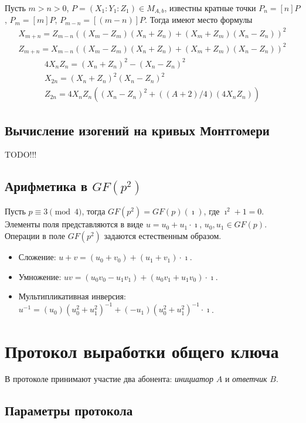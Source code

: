 \documentclass[a4paper,12pt]{article}
\theoremstyle{definition}
\begin{document}
Пусть $m>n>0$, $P=(X_1:Y_1:Z_1)\in M_{A,b}$, известны кратные точки $P_{n}=[n]P$, $P_{m}=[m]P$, $P_{m-n}=[(m-n)]P$. Тогда имеют место формулы
\begin{eqnarray*}
X_{m+n}=Z_{m-n}((X_m-Z_m)(X_n+Z_n)+(X_m+Z_m)(X_n-Z_n))^2\\
Z_{m+n}=X_{m-n}((X_m-Z_m)(X_n+Z_n)+(X_m+Z_m)(X_n-Z_n))^2
\end{eqnarray*}
\begin{eqnarray*}
4X_nZ_n=(X_n+Z_n)^2-(X_n-Z_n)^2\\
X_{2n}=(X_n+Z_n)^2(X_n-Z_n)^2\\
Z_{2n}=4X_nZ_n((X_n-Z_n)^2+((A+2)/4)(4X_nZ_n))
\end{eqnarray*}

\subsection{Вычисление изогений на кривых Монтгомери}

TODO!!!

\subsection{Арифметика в $GF(p^2)$}

Пусть $p\equiv 3\pmod{4}$, тогда $GF(p^2) = GF(p)(\imath)$, где $\imath^2+1=0$.
Элементы поля представляются в виде $u=u_0+u_1\cdot\imath$, $u_0, u_1\in GF(p)$.
Операции в поле $GF(p^2)$ задаются естественным образом.
\begin{itemize}
 \item Сложение: $u+v = (u_0+v_0) + (u_1+v_1)\cdot\imath$.
 \item Умножение: $uv = (u_0v_0-u_1v_1) + (u_0v_1+u_1v_0)\cdot\imath$.
 \item Мультипликативная инверсия: $u^{-1} = (u_0)(u_0^2+u_1^2)^{-1} + (-u_1)(u_0^2+u_1^2)^{-1}\cdot\imath   $.
\end{itemize}




\section{Протокол выработки общего ключа}\label{protodesc}

В протоколе принимают участие два абонента: \emph{инициатор} $A$ и \emph{ответчик} $B$.

\subsection*{Параметры протокола}
\end{document}
